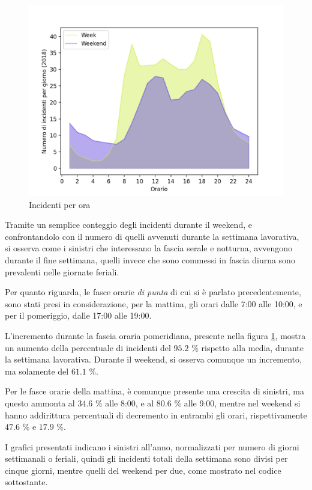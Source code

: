 \documentclass[a4paper,12pt]{report}
\newcommand{\quotestyle}[1]{\textit{#1}}
\begin{document}
\begin{figure}
    \includegraphics[width=\linewidth]{../src/incidenti/incidenti_senza_coords/ore_punta/week_weekend.png}
    \caption{Incidenti per ora}
    \label{fig:week-weekend}
\end{figure}

Tramite un semplice conteggio degli incidenti durante il weekend, e 
confrontandolo con il numero di quelli avvenuti durante la 
settimana lavorativa, si osserva come i sinistri che interessano la fascia serale 
e notturna, avvengono durante il fine settimana, quelli invece che sono commessi 
in fascia diurna sono prevalenti nelle giornate feriali. 

Per quanto riguarda, le fasce orarie \quotestyle{di punta} di cui si 
è parlato precedentemente, 
sono stati presi in considerazione, per la mattina, gli orari dalle 7:00 alle 10:00, 
e per il pomeriggio, dalle 17:00 alle 19:00. 

L'incremento durante la fascia oraria pomeridiana, presente nella figura 
\ref{fig:week-weekend}, mostra un aumento della percentuale di incidenti 
del $95.2$ \% rispetto alla media, durante la settimana lavorativa. 
Durante il weekend, si osserva comunque un incremento, ma solamente del $61.1$ \%. 

Per le fasce orarie della mattina, è comunque presente una crescita di sinistri, 
ma questo ammonta al $34.6$ \% alle 8:00, e al $80.6$ \% alle 9:00, 
mentre nel weekend si hanno addirittura percentuali di decremento 
in entrambi gli orari, rispettivamente $47.6$ \% e $17.9$ \%. 

I grafici presentati indicano i sinistri all'anno, normalizzati per numero di 
giorni settimanali o feriali, quindi gli incidenti totali della settimana sono divisi 
per cinque giorni, mentre quelli del weekend per due, 
come mostrato nel codice sottostante. 
\end{document}
